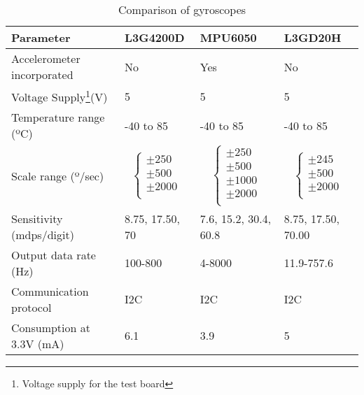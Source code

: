 \begin{table}[H]
\centering
\begin{tabular}{|l|l|l|l|}
\hline\hline
\textbf{Parameter}		 				 & \textbf{L3G4200D}	& \textbf{MPU6050} & \textbf{L3GD20H}			\\	\hline
Accelerometer incorporated		 & No													& Yes												&		 No										\\ 	\hline
Voltage Supply\footnote{Voltage supply for the test board}(V) &  			5														& 5												& 	 5										\\ 	\hline
 Temperature range (ºC) 	 & -40 to 85						& -40 to 85										&  -40 to 85  								 	\\ 	\hline
Scale range (º/sec)   			&\begin{equation*}  \left\lbrace  \begin{array}{l}     \pm250 \\     \pm500 \\\pm2000\\ \end{array}  \right.\end{equation*}  &
\begin{equation*}  \left\lbrace  \begin{array}{l}     \pm250 \\     \pm500 \\\pm1000 \\\pm2000\\ \end{array}  \right.\end{equation*}  &   
\begin{equation*}  \left\lbrace  \begin{array}{l}     \pm245 \\     \pm500 \\\pm2000\\ \end{array}  \right.\end{equation*}								\\ 	\hline
Sensitivity (mdps/digit)	 & 	8.75,  17.50,  70		& 7.6, 15.2, 30.4, 60.8 &  8.75,  17.50, 70.00								\\	\hline
Output data rate (Hz)  & 100-800	& 4-8000		& 11.9-757.6		\\	\hline
Communication protocol  & I2C											& I2C		&  I2C							\\	\hline
Consumption at 3.3V (mA)  & 6.1											& 3.9	& 	5				\\	\hline
\hline
\end{tabular}
\caption{Comparison of gyroscopes \cite{MPU6050}\cite{L3G4200D}\cite{L3GD20H}}\label{tab:gyroscope}
\end{table}

